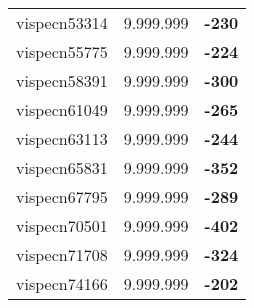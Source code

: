 \begin{tabular}{cc||c}
vispecn53314     & 9.999.999        & {\bf -230}      \\ 
vispecn55775     & 9.999.999        & {\bf -224}      \\ 
vispecn58391     & 9.999.999        & {\bf -300}      \\ 
vispecn61049     & 9.999.999        & {\bf -265}      \\ 
vispecn63113     & 9.999.999        & {\bf -244}      \\ 
vispecn65831     & 9.999.999        & {\bf -352}      \\ 
vispecn67795     & 9.999.999        & {\bf -289}      \\ 
vispecn70501     & 9.999.999        & {\bf -402}      \\ 
vispecn71708     & 9.999.999        & {\bf -324}      \\ 
vispecn74166     & 9.999.999        & {\bf -202}      \\ 
\end{tabular}